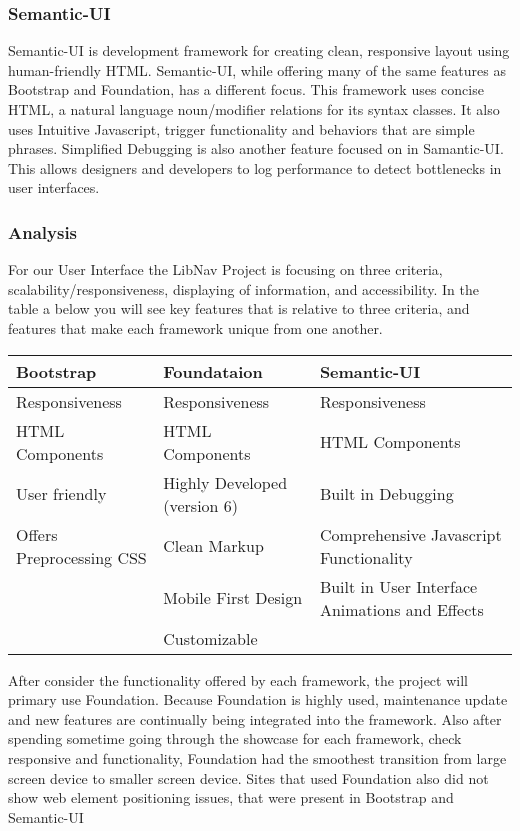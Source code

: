 \documentclass[letterpaper,10pt,titlepage, onecolumn, compsoc]{IEEEtran}
\begin{document}
\subsubsection{Semantic-UI}
Semantic-UI is development framework for creating clean, responsive layout using human-friendly HTML. Semantic-UI, while offering many of the same features as Bootstrap and Foundation, has a different focus. This framework uses concise HTML, a natural language noun/modifier relations for its syntax classes. It also uses Intuitive Javascript, trigger functionality and behaviors that are simple phrases. Simplified Debugging is also another feature focused on in Samantic-UI. This allows designers and developers to log performance to detect bottlenecks in user interfaces. \cite{semanticui2016}

\subsubsection{Analysis}
For our User Interface the LibNav Project is focusing on three criteria, scalability/responsiveness, displaying of information, and accessibility. In the table a below you will see key features that is relative to  three criteria, and features that make each framework unique from one another. 
\begin{center}
\begin{tabular}{|p{4.25cm}|p{4.25cm}|p{4.25cm}|}
\hline
\textbf{Bootstrap}       & \textbf{Foundataion}         & \textbf{Semantic-UI} 
\\[1ex] \hline
Responsiveness           & Responsiveness               & Responsiveness                                 \\[1ex] \hline
HTML Components          & HTML Components              & HTML Components                                \\[1ex] \hline
User friendly            & Highly Developed (version 6) & Built in Debugging                             \\[1ex] \hline
Offers Preprocessing CSS & Clean Markup                 & Comprehensive Javascript Functionality         
\\[1ex] \hline
                         & Mobile First Design          & Built in User Interface Animations and Effects 
\\[1ex] \hline
                         & Customizable                 &                                     \\[1ex] \hline
\end{tabular}
\end{center}
After consider the functionality offered by each framework, the project will primary use Foundation. Because Foundation is highly used, maintenance update and new features are continually being integrated into the framework. Also after spending sometime going through the showcase for each framework, check responsive  and functionality, Foundation had the smoothest transition from large screen device to smaller screen device. Sites that used Foundation also did not show web element positioning issues, that were present in Bootstrap and Semantic-UI
\end{document}
